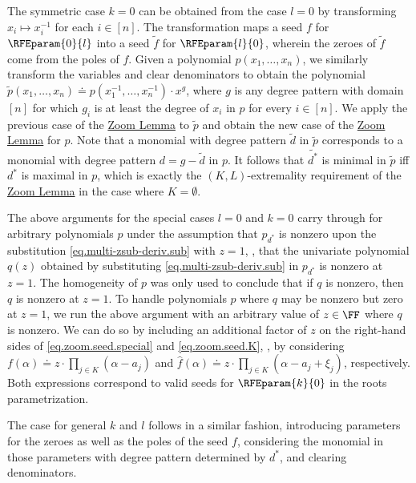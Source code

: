 The symmetric case $k=0$ can be obtained from the case $l=0$ by transforming
$x_i \mapsto x_i^{-1}$ for each $i \in [n]$.
The transformation maps a seed $f$ for $\RFEparam{0}{l}$ into a seed
$\tilde{f}$ for $\RFEparam{l}{0}$,
wherein the zeroes of \(\tilde{f}\) come from the poles of $f$.
Given a polynomial $p(x_1,\dots,x_n)$,
we similarly transform the variables and clear denominators to obtain the
polynomial
$\tilde{p}(x_1,\dots,x_n) \doteq p(x_1^{-1},\dots,x_n^{-1}) \cdot x^{g}$,
where $g$ is any degree pattern with domain $[n]$ for which
$g_i$ is at least the degree of \(x_i\) in \(p\) for every $i \in [n]$.
We apply the previous case of the \hyperref[lem.multi-zsub-deriv]{Zoom Lemma} to $\tilde{p}$ and obtain the new
case of the \hyperref[lem.multi-zsub-deriv]{Zoom Lemma} for $p$.
Note that a monomial with degree pattern $\tilde{d}$ in $\tilde{p}$
corresponds to a monomial with degree pattern $d = g - \tilde{d}$ in
$p$.
It follows that $\widetilde{d^*}$ is minimal in $\tilde{p}$ iff $d^*$ is
maximal in $p$,
which is exactly the $(K,L)$-extremality requirement of
the \hyperref[lem.multi-zsub-deriv]{Zoom Lemma} in the
case where $K=\emptyset$.

The above arguments for the special cases $l=0$ and $k=0$ carry through for arbitrary polynomials $p$ under the assumption that $p_{d^*}$ is nonzero upon the substitution \eqref{eq.multi-zsub-deriv.sub} with $z=1$, \ie, that the univariate polynomial $q(z)$ obtained by substituting \eqref{eq.multi-zsub-deriv.sub} in $p_{d^*}$ is nonzero at $z=1$. The homogeneity of $p$ was only used to conclude that if $q$ is nonzero, then $q$ is nonzero at $z=1$. To handle polynomials $p$ where $q$ may be nonzero but zero at $z=1$, we run the above argument with an arbitrary value of $z \in \FF$ where $q$ is nonzero. We can do so by including an additional factor of $z$ on the right-hand sides of \eqref{eq.zoom.seed.special} and \eqref{eq.zoom.seed.K}, \ie, by considering
$f(\alpha) \doteq z \cdot \prod_{j\in K}(\alpha - a_j)$ and 
$\hat{f}(\alpha) \doteq z \cdot \prod_{j \in K} (\alpha - a_j + \xi_j)$, respectively. Both expressions correspond to valid seeds for $\RFEparam{k}{0}$ in the roots parametrization. 

The case for general $k$ and $l$ follows in a similar fashion, introducing parameters for the zeroes as well as the poles of the seed $f$, considering the monomial in those parameters with degree pattern determined by \(d^*\), and clearing denominators. 

